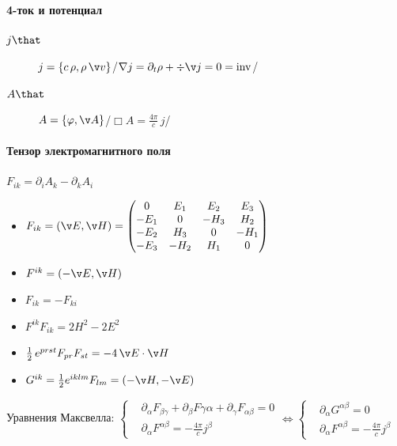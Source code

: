 \documentclass{trchesh}
\def\waveop{\mathop{\boldsymbol\Box}}
\begin{document}
\begin{multicols*}{3}
\paragraph{4-ток и потенциал}

\begin{description}
\item[$j \that$] $j=\{c\,\rho, \rho\,\v v\}$\hfill /$\nabla j=\partial_t\rho + \div\v j = 0 = \rm inv$/
\item[$A \that$] $A=\{\varphi, \v A\}$\hfill /$\waveop A = \frac{4\pi}{c} \, j$/
\end{description}

\paragraph{Тензор электромагнитного поля}
$F_{ik} = \partial_i A_k - \partial_k A_i$
\begin{itemize}
  \item $F_{ik} = (\v E, \v H) = \begin{pmatrix}
       0   &  E_1  &  E_2  &  E_3 \\
      -E_1 &  0    & -H_3  &  H_2 \\
      -E_2 &  H_3  &  0    & -H_1 \\
      -E_3 & -H_2  &  H_1  &  0   \\
  \end{pmatrix}$
\item $F^{ik} = (-\v E, \v H)$
\item $F_{ik} = -F_{ki}$
\item $F^{ik}F_{ik} = 2 H^2 - 2 E^2$
\item $\frac{1}{2} \, e^{prst} F_{pr} F_{st} = - 4\, \v E \cdot \v H$
\item $G^{ik} = \frac 12 e^{iklm} F_{lm} = (-\v H, -\v E)$
\end{itemize}

Уравнения Максвелла:
$\left\{
\begin{aligned}
  &\partial_\alpha F_{\beta\gamma}+\partial_\beta F{\gamma\alpha}+\partial_\gamma F_{\alpha\beta}=0\\
  &\partial_\alpha F^{\alpha \beta} = - \frac{4\pi}{c} j^\beta  
\end{aligned}\right. \Leftrightarrow
\left\{
\begin{aligned}
  &\partial_\alpha G^{\alpha \beta} = 0 \\
  &\partial_\alpha F^{\alpha \beta} = - \frac{4\pi}{c} j^\beta  
\end{aligned}\right.
$


\end{multicols*}
\end{document}

